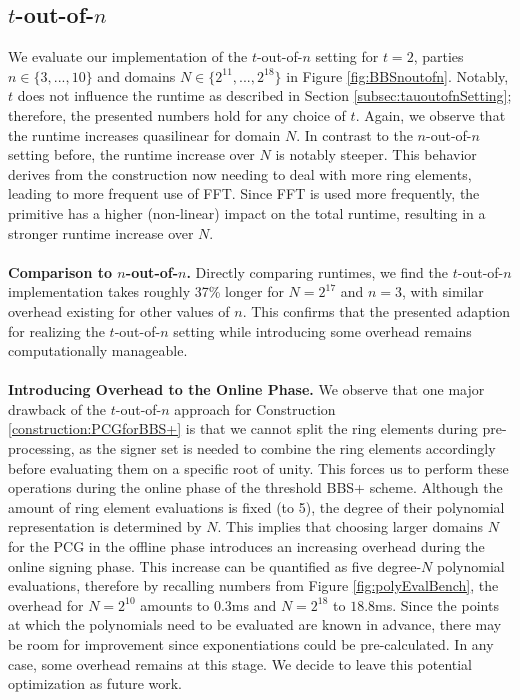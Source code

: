 \subsection{$t$-out-of-$n$}
\label{subsec:toutofnEval}
We evaluate our implementation of the $t$-out-of-$n$ setting for $t = 2$, parties $n\in \{3, ..., 10\}$ and domains $N\in \{2^{11}, ...,2^{18}\}$ in Figure \ref{fig:BBSnoutofn}. Notably, $t$ does not influence the runtime as described in Section \ref{subsec:tauoutofnSetting}; therefore, the presented numbers hold for any choice of $t$. Again, we observe that the runtime increases quasilinear for domain $N$. In contrast to the $n$-out-of-$n$ setting before, the runtime increase over $N$ is notably steeper. This behavior derives from the construction now needing to deal with more ring elements, leading to more frequent use of FFT. Since FFT is used more frequently, the primitive has a higher (non-linear) impact on the total runtime, resulting in a stronger runtime increase over $N$.
\\\\
\textbf{Comparison to $n$-out-of-$n$.} Directly comparing runtimes, we find the $t$-out-of-$n$ implementation takes roughly 37\% longer for $N=2^{17}$ and $n=3$, with similar overhead existing for other values of $n$. This confirms that the presented adaption for realizing the $t$-out-of-$n$ setting while introducing some overhead remains computationally manageable.
\\\\
\textbf{Introducing Overhead to the Online Phase.} We observe that one major drawback of the $t$-out-of-$n$ approach for Construction \ref{construction:PCGforBBS+} is that we cannot split the ring elements during pre-processing, as the signer set is needed to combine the ring elements accordingly before evaluating them on a specific root of unity. This forces us to perform these operations during the online phase of the threshold BBS+ scheme. Although the amount of ring element evaluations is fixed (to 5), the degree of their polynomial representation is determined by $N$. This implies that choosing larger domains $N$ for the PCG in the offline phase introduces an increasing overhead during the online signing phase. This increase can be quantified as five degree-$N$ polynomial evaluations, therefore by recalling numbers from Figure \ref{fig:polyEvalBench}, the overhead for $N=2^{10}$ amounts to $0.3$ms and $N=2^{18}$ to $18.8$ms. Since the points at which the polynomials need to be evaluated are known in advance, there may be room for improvement since exponentiations could be pre-calculated. In any case, some overhead remains at this stage. We decide to leave this potential optimization as future work.

